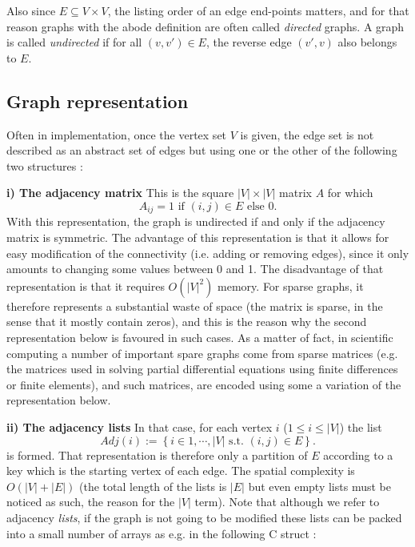\documentclass[12pt]{article}
\theoremstyle{plain}
\theoremstyle{remark}
\begin{document}
\medskip

Also since $E \subseteq V \times V$, the listing order
of an edge end-points matters, and for that reason graphs with the
abode definition are often called {\it directed} graphs. A graph is called {\it
undirected} if for all $(v,v') \in E$, the reverse edge $(v',v)$ also belongs to
$E.$

\subsection{Graph representation}

Often in implementation, once the vertex set $V$ is given, the edge set is not 
described as an abstract set of edges but using one or the other 
of the following two structures : 

\medskip

{\bf i) The adjacency matrix} This is the square $|V| \times |V|$ matrix $A$ for which
$$
A_{ij} = 1 \text{ if } (i,j) \in E \text{ else } 0.
$$
With this representation, the graph is undirected if and only if the adjacency
matrix is symmetric. The advantage of this representation is that it allows for
easy modification of the connectivity (i.e. adding or removing edges), since it
only amounts to changing some values between 0 and 1. The disadvantage of that 
representation is that it requires $O(|V|^2)$ memory. For sparse graphs, it
therefore represents a substantial waste of space (the matrix is sparse, in the
sense that it mostly contain zeros), and this is the reason why the second
representation below is favoured in such cases. As a matter of fact, in
scientific computing a number of important spare graphs come from sparse
matrices (e.g. the matrices used in solving partial differential equations using
finite differences or finite elements), and such matrices, are encoded using some 
a variation of the representation below.

\medskip

{\bf ii) The adjacency lists} In that case, for each vertex $i$ ($1 \leq i
\leq |V|$) the list
$$
Adj(i) := \left\{ i \in 1,\cdots, |V| \text{ s.t. } (i,j) \in E\right\}.
$$
is formed. That representation is therefore only a partition of $E$ according to
a key which is the starting vertex of each edge. The spatial complexity is 
$O(|V| + |E|)$ (the total length of the lists is $|E|$ but even empty lists
must be noticed as such, the reason for the $|V|$ term). Note that although
we refer to adjacency {\it lists}, if the graph is not going to be modified these 
lists can be packed into a small number of arrays as e.g. in the following C struct :
\end{document}
